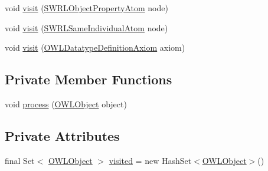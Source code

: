 \begin{DoxyCompactItemize}
\item 
void \hyperlink{classorg_1_1semanticweb_1_1owlapi_1_1util_1_1_o_w_l_object_walker_3_01_o_01extends_01_o_w_l_object_01_4_1_1_structure_walker_acd77cc73debfcc060ae9bcab500292fd}{visit} (\hyperlink{interfaceorg_1_1semanticweb_1_1owlapi_1_1model_1_1_s_w_r_l_object_property_atom}{S\-W\-R\-L\-Object\-Property\-Atom} node)
\item 
void \hyperlink{classorg_1_1semanticweb_1_1owlapi_1_1util_1_1_o_w_l_object_walker_3_01_o_01extends_01_o_w_l_object_01_4_1_1_structure_walker_a9d96be46da849cb363e19ec5c9f0e62c}{visit} (\hyperlink{interfaceorg_1_1semanticweb_1_1owlapi_1_1model_1_1_s_w_r_l_same_individual_atom}{S\-W\-R\-L\-Same\-Individual\-Atom} node)
\item 
void \hyperlink{classorg_1_1semanticweb_1_1owlapi_1_1util_1_1_o_w_l_object_walker_3_01_o_01extends_01_o_w_l_object_01_4_1_1_structure_walker_aeed26c7981d20d2053fb8ce372e6ad7e}{visit} (\hyperlink{interfaceorg_1_1semanticweb_1_1owlapi_1_1model_1_1_o_w_l_datatype_definition_axiom}{O\-W\-L\-Datatype\-Definition\-Axiom} axiom)
\end{DoxyCompactItemize}
\subsection*{Private Member Functions}
\begin{DoxyCompactItemize}
\item 
void \hyperlink{classorg_1_1semanticweb_1_1owlapi_1_1util_1_1_o_w_l_object_walker_3_01_o_01extends_01_o_w_l_object_01_4_1_1_structure_walker_a1645f7e033baf59a5514d09f35aa8dc3}{process} (\hyperlink{interfaceorg_1_1semanticweb_1_1owlapi_1_1model_1_1_o_w_l_object}{O\-W\-L\-Object} object)
\end{DoxyCompactItemize}
\subsection*{Private Attributes}
\begin{DoxyCompactItemize}
\item 
final Set$<$ \hyperlink{interfaceorg_1_1semanticweb_1_1owlapi_1_1model_1_1_o_w_l_object}{O\-W\-L\-Object} $>$ \hyperlink{classorg_1_1semanticweb_1_1owlapi_1_1util_1_1_o_w_l_object_walker_3_01_o_01extends_01_o_w_l_object_01_4_1_1_structure_walker_ae63c2640e51958755da407a34ec4a79d}{visited} = new Hash\-Set$<$\hyperlink{interfaceorg_1_1semanticweb_1_1owlapi_1_1model_1_1_o_w_l_object}{O\-W\-L\-Object}$>$()
\end{DoxyCompactItemize}


